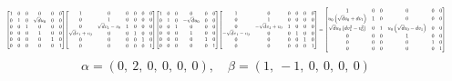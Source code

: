 \documentclass[11pt]{article}
\theoremstyle{definition}
\begin{document}
\[
\scaletoalign{\textwidth}{{\left[\begin{matrix}1 & 0 & 0 & 0 & 0 & 0\\0 & 1 & 0 & \sqrt{d} u_{0} & 0 & 0\\0 & 0 & 1 & 0 & 0 & 0\\0 & 0 & 0 & 1 & 0 & 0\\0 & 0 & 0 & 0 & 1 & 0\\0 & 0 & 0 & 0 & 0 & 1\end{matrix}\right]} {\left[\begin{matrix}1 & 0 & 0 & 0 & 0 & 0\\0 & 1 & 0 & 0 & 0 & 0\\0 & \sqrt{d} v_{1} - v_{0} & 1 & 0 & 0 & 0\\\sqrt{d} v_{1} + v_{0} & 0 & 0 & 1 & 0 & 0\\0 & 0 & 0 & 0 & 1 & 0\\0 & 0 & 0 & 0 & 0 & 1\end{matrix}\right]} {\left[\begin{matrix}1 & 0 & 0 & 0 & 0 & 0\\0 & 1 & 0 & - \sqrt{d} u_{0} & 0 & 0\\0 & 0 & 1 & 0 & 0 & 0\\0 & 0 & 0 & 1 & 0 & 0\\0 & 0 & 0 & 0 & 1 & 0\\0 & 0 & 0 & 0 & 0 & 1\end{matrix}\right]} {\left[\begin{matrix}1 & 0 & 0 & 0 & 0 & 0\\0 & 1 & 0 & 0 & 0 & 0\\0 & - \sqrt{d} v_{1} + v_{0} & 1 & 0 & 0 & 0\\- \sqrt{d} v_{1} - v_{0} & 0 & 0 & 1 & 0 & 0\\0 & 0 & 0 & 0 & 1 & 0\\0 & 0 & 0 & 0 & 0 & 1\end{matrix}\right]} = {\left[\begin{matrix}1 & 0 & 0 & 0 & 0 & 0\\u_{0} \left(\sqrt{d} v_{0} + d v_{1}\right) & 1 & 0 & 0 & 0 & 0\\\sqrt{d} u_{0} \left(d v_{1}^{2} - v_{0}^{2}\right) & 0 & 1 & u_{0} \left(\sqrt{d} v_{0} - d v_{1}\right) & 0 & 0\\0 & 0 & 0 & 1 & 0 & 0\\0 & 0 & 0 & 0 & 1 & 0\\0 & 0 & 0 & 0 & 0 & 1\end{matrix}\right]}}
\]
\[
\alpha = \left( 0, \  2, \  0, \  0, \  0, \  0\right), \quad \beta = \left( 1, \  -1, \  0, \  0, \  0, \  0\right)
\]
\end{document}
